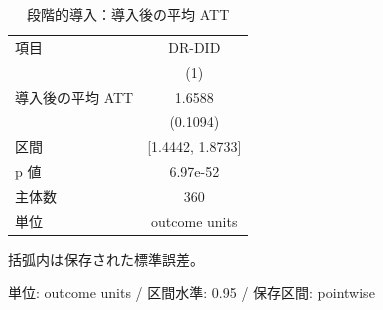 \begingroup
\begin{table}[htbp]
\centering
\caption{段階的導入：導入後の平均 ATT}
\label{tab:specialist-did-r01-overall}
\begin{tabular}{lc}
\toprule
項目 & DR-DID \\
 & (1) \\
\midrule
導入後の平均 ATT & 1.6588 \\
 & (0.1094) \\
区間 & [1.4442, 1.8733] \\
p 値 & 6.97e-52 \\
\midrule
主体数 & 360 \\
単位 & outcome units \\
\bottomrule
\end{tabular}
\par\medskip\begin{minipage}{\linewidth}\footnotesize
括弧内は保存された標準誤差。\par 単位: outcome units / 区間水準: 0.95 / 保存区間: pointwise
\end{minipage}
\end{table}
\endgroup
